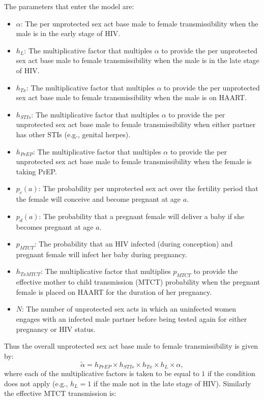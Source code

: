 \documentclass[11pt]{nih_mod}
\begin{document}
The parameters that enter the model are:
\begin{itemize}
	\item $\alpha$: The per unprotected sex act base male to female transmissibility when the male is in the early stage of HIV.
	\item $h_L$: The multiplicative factor that multiples $\alpha$ to provide the per unprotected sex act base male to female transmissibility when the male is in the late stage of HIV.
	\item $h_{Tx}$: The multiplicative factor that multiples $\alpha$ to provide the per unprotected sex act base male to female transmissibility when the male is on HAART.
	\item $h_{STIs}$: The multiplicative factor that multiples $\alpha$ to provide the per unprotected sex act base male to female transmissibility when either partner has other STIs (e.g., genital herpes). 
	\item $h_{PrEP}$: The multiplicative factor that multiples $\alpha$ to provide the per unprotected sex act base male to female transmissibility when the female is taking PrEP.
	\item $p_c(a)$: The probability per unprotected sex act over the fertility period that the female will conceive and become pregnant at age $a$.
	\item $p_d(a)$: The probability that a pregnant female will deliver a baby if she becomes pregnant at age $a$.
	\item $p_{MTCT}$: The probability that an HIV infected (during conception) and pregnant female will infect her baby during pregnancy. 
	\item $h_{TxMTCT}$: The multiplicative factor that multiplies $p_{MTCT}$ to provide the effective mother to child transmission (MTCT) probability when the pregnant female is placed on HAART for the duration of her pregnancy. 
	\item $N$: The number of unprotected sex acts in which an uninfected women engages with an infected male partner before being tested again for either pregnancy or HIV status.
\end{itemize}
Thus the overall unprotected sex act base male to female transmissibility is given by:
\begin{equation}
	\tilde{\alpha} = h_{PrEP}\times h_{STIs}\times h_{Tx}\times h_L \times \alpha, 
\end{equation}
where each of the multiplicative factors is taken to be equal to $1$ if the condition does not apply (e.g., $h_L=1$ if the male not in the late stage of HIV). Similarly the effective MTCT transmission is:
\end{document}
